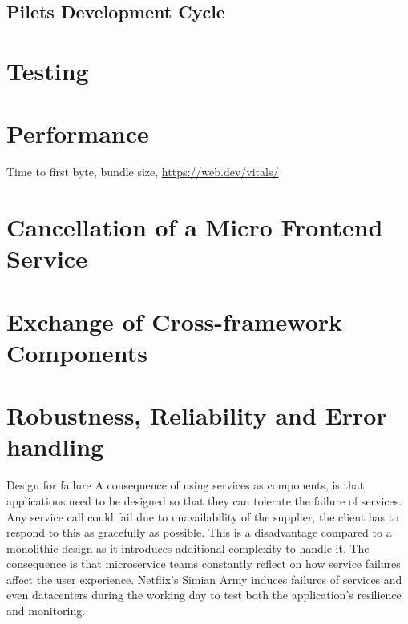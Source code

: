 \documentclass[a4paper]{book}
\begin{document}
\subsection{Pilets Development Cycle}
\section{Testing}
\section{Performance }
Time to first byte, bundle size, \url{https://web.dev/vitals/}
\section{Cancellation of a Micro Frontend Service}
\section{Exchange of Cross-framework Components}
\section{Robustness, Reliability and Error handling}

Design for failure
A consequence of using services as components, is that applications need to be designed so that they can tolerate the failure of services. Any service call could fail due to unavailability of the supplier, the client has to respond to this as gracefully as possible. This is a disadvantage compared to a monolithic design as it introduces additional complexity to handle it. The consequence is that microservice teams constantly reflect on how service failures affect the user experience. Netflix's Simian Army induces failures of services and even datacenters during the working day to test both the application's resilience and monitoring.

\end{document}
